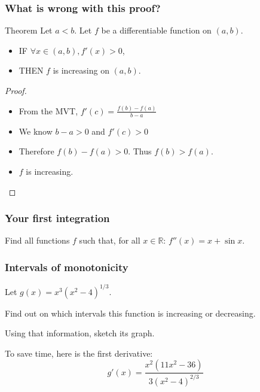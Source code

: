 \documentclass[14pt]{beamer}
\begin{document}
	\begin{frame}[t]
		\frametitle{What is wrong with this proof?}

		\begin{block}{Theorem}
			Let $a < b$. Let $f$ be a differentiable function on $(a,b)$.
			\begin{itemize}
				\item IF $\forall x \in (a,b), f'(x) >0$,

				\item THEN $f$ is increasing on $(a,b)$.
			\end{itemize}
		\end{block}

		\begin{proof}
			\begin{itemize}
				\item From the MVT, $\displaystyle  f'(c) = \frac{f(b) - f(a)}{b-a} $

				\item We know $\displaystyle b-a>0$ and $\displaystyle f'(c)>0$

				\item Therefore $\displaystyle f(b) - f(a)>0$. \quad Thus
					$\displaystyle f(b) > f(a)$.

				\item $f$ is increasing.
			\end{itemize}
		\end{proof}
	\end{frame}
	\begin{frame}[t]
		\frametitle{Your first integration}

		Find all functions $f$ such that, for all $\displaystyle x \in \mathbb{R}$:
		$\displaystyle f''(x) = x + \sin x$.
	\end{frame}


	\begin{frame}
		\frametitle{Intervals of monotonicity}

		Let $\displaystyle  g(x) = x^3(x^2-4)^{1/3}. $

		\medskip
		Find out on which intervals this function is increasing or decreasing.

		Using that information, sketch its graph.

		\medskip
		To save time, here is the first derivative:
		\[
			g'(x) = \frac{x^{2}(11x^{2}-36)}{3(x^{2}-4)^{2/3}}
		\]
	\end{frame}
\end{document}
